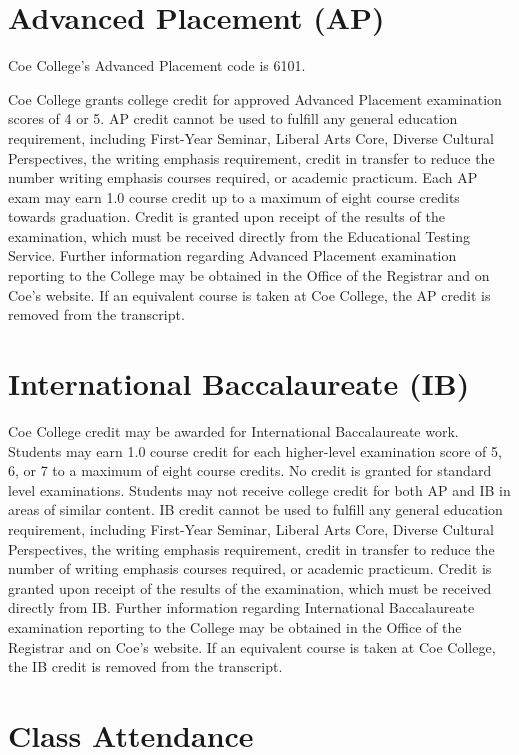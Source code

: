 \documentclass[
  letterpaper,
]{scrbook}
\begin{document}
\section{Advanced Placement (AP)}\label{advanced-placement-ap}

Coe College's Advanced Placement code is 6101.

Coe College grants college credit for approved Advanced Placement
examination scores of 4 or 5. AP credit cannot be used to fulfill any
general education requirement, including First-Year Seminar, Liberal
Arts Core, Diverse Cultural Perspectives, the writing emphasis
requirement, credit in transfer to reduce the number writing emphasis
courses required, or academic practicum. Each AP exam may earn 1.0
course credit up to a maximum of eight course credits towards
graduation. Credit is granted upon receipt of the results of the
examination, which must be received directly from the Educational
Testing Service. Further information regarding Advanced Placement
examination reporting to the College may be obtained in the Office of
the Registrar and on Coe's website. If an equivalent course is taken at
Coe College, the AP credit is removed from the transcript.

\section{International Baccalaureate
(IB)}\label{international-baccalaureate-ib}

Coe College credit may be awarded for International Baccalaureate work.
Students may earn 1.0 course credit for each higher-level examination
score of 5, 6, or 7 to a maximum of eight course credits. No credit is
granted for standard level examinations. Students may not receive
college credit for both AP and IB in areas of similar content. IB credit
cannot be used to fulfill any general education requirement, including
First-Year Seminar, Liberal Arts Core, Diverse Cultural Perspectives,
the writing emphasis requirement, credit in transfer to reduce the
number of writing emphasis courses required, or academic practicum.
Credit is granted upon receipt of the results of the examination, which
must be received directly from IB. Further information regarding
International Baccalaureate examination reporting to the College may be
obtained in the Office of the Registrar and on Coe's website. If an
equivalent course is taken at Coe College, the IB credit is removed from
the transcript.

\section{Class Attendance}\label{class-attendance}
\end{document}
